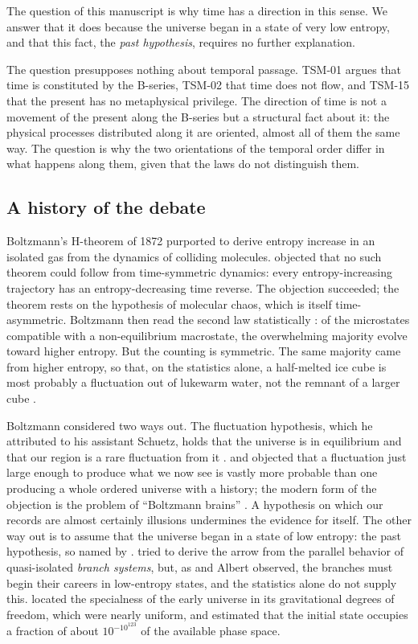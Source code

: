 \documentclass{situationist-preprint}
\begin{document}
The question of this manuscript is why time has a direction in this sense. We answer that it does because the universe began in a state of very low entropy, and that this fact, the \emph{past hypothesis}, requires no further explanation.

The question presupposes nothing about temporal passage. TSM-01 argues that time is constituted by the B-series, TSM-02 that time does not flow, and TSM-15 that the present has no metaphysical privilege. The direction of time is not a movement of the present along the B-series but a structural fact about it: the physical processes distributed along it are oriented, almost all of them the same way. The question is why the two orientations of the temporal order differ in what happens along them, given that the laws do not distinguish them.

\subsection{A history of the debate}\label{ss:history}

Boltzmann's H-theorem of 1872 purported to derive entropy increase in an isolated gas from the dynamics of colliding molecules. \citet{Loschmidt1876} objected that no such theorem could follow from time-symmetric dynamics: every entropy-increasing trajectory has an entropy-decreasing time reverse. The objection succeeded; the theorem rests on the hypothesis of molecular chaos, which is itself time-asymmetric. Boltzmann then read the second law statistically \citep{Boltzmann1896}: of the microstates compatible with a non-equilibrium macrostate, the overwhelming majority evolve toward higher entropy. But the counting is symmetric. The same majority came from higher entropy, so that, on the statistics alone, a half-melted ice cube is most probably a fluctuation out of lukewarm water, not the remnant of a larger cube \citep{Albert2000}.

Boltzmann considered two ways out. The fluctuation hypothesis, which he attributed to his assistant Schuetz, holds that the universe is in equilibrium and that our region is a rare fluctuation from it \citep{Boltzmann1895}. \citet{Eddington1928} and \citet{Feynman1965} objected that a fluctuation just large enough to produce what we now see is vastly more probable than one producing a whole ordered universe with a history; the modern form of the objection is the problem of \enquote{Boltzmann brains} \citep{DysonKlebanSusskind2002,AlbrechtSorbo2004}. A hypothesis on which our records are almost certainly illusions undermines the evidence for itself. The other way out is to assume that the universe began in a state of low entropy: the past hypothesis, so named by \citet{Albert2000}. \citet{Reichenbach1956} tried to derive the arrow from the parallel behavior of quasi-isolated \emph{branch systems}, but, as \citet{Sklar1993} and Albert observed, the branches must begin their careers in low-entropy states, and the statistics alone do not supply this. \citet{Penrose1979,Penrose1989} located the specialness of the early universe in its gravitational degrees of freedom, which were nearly uniform, and estimated that the initial state occupies a fraction of about $10^{-10^{123}}$ of the available phase space.
\end{document}
